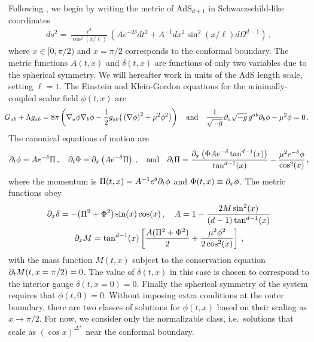 \documentclass[../PhD.tex]{subfiles}
\begin{document}
Following \cite{1508.02709}, we begin by writing the metric of AdS$_{d+1}$ in Schwarzschild-like coordinates 
\begin{align}
ds^2 = \frac{\ell^2}{\cos^2 \left(x / \ell \right)} \left( A e^{-2\delta} dt^2 + A^{-1}dx^2 \sin^2 \left(x / \ell \right) d\Omega^{d-1} \right) \, ,
\end{align}
where $x \in [0, \pi/2)$ and $x = \pi / 2$ corresponds to the conformal boundary. The metric functions $A(t,x)$ and $\delta(t,x)$ are functions of only two variables due to the spherical symmetry. We will hereafter work in units of the AdS length scale, setting $\ell = 1$. The Einstein and Klein-Gordon equations for the minimally-coupled scalar field $\phi(t,x)$ are
\begin{align}
\!\!\!\! G_{ab} + \Lambda g_{ab} = 8\pi \left( \nabla_a \phi \nabla_b \phi - \frac{1}{2} g_{ab} \big( \left( \nabla \phi \right)^2 + \mu^2 \phi^2 \big) \right) \quad \text{and} \quad \frac{1}{\sqrt{-g}} \partial_a \sqrt{-g} \, g^{ab} \partial_b \phi - \mu^2 \phi = 0 \, .
\end{align}
The canonical equations of motion are \cite{1210.1566}
\begin{align}
\label{canon eqns}
\partial_t \phi = A e^{-\delta} \Pi \, , \quad \partial_t \Phi = \partial_x \left( A e^{-\delta} \Pi \right) \, , \quad \text{and} \quad \partial_t \Pi = \frac{\partial_x \left( \Phi A e^{-\delta} \tan^{d-1} (x) \right)}{\tan^{d-1}(x)} - \frac{\mu^2 e^{-\delta} \phi}{\cos^2 (x)} \, ,
\end{align}
where the momentum is $\Pi(t,x) = A^{-1} e^{\delta} \partial_t \phi$ and $\Phi(t,x) \equiv \partial_x \phi$. The metric functions obey
\begin{align}
\label{metric funcs}
\begin{gathered}
\partial_x \delta = - (\Pi^2 + \Phi^2 ) \sin (x) \cos(x) \, , \quad A = 1 - \frac{2M \sin^2 (x) }{(d-1) \tan^{d-1}(x)} \\
\partial_x M = \tan^{d-1}(x) \left[ \frac{A (\Pi^2 + \Phi^2)}{2} + \frac{\mu^2 \phi^2}{2 \cos^2 (x)} \right] \, ,
\end{gathered}
\end{align}
with the mass function $M(t,x)$ subject to the conservation equation $\partial_t M( t, x = \pi/2) = 0$. The value of $\delta(t,x)$ in this case is chosen to correspond to the interior gauge $\delta(t,x=0) = 0$. Finally the spherical symmetry of the system requires that $\phi (t, 0) = 0$. Without imposing extra conditions at the outer boundary, there are two classes of solutions for $\phi(t,x)$ based on their scaling as $x \to \pi/2$. For now, we consider only the normalizable class, i.e.~solutions that scale as $(\cos x)^{\Delta^+}$ near the conformal boundary.
\end{document}
